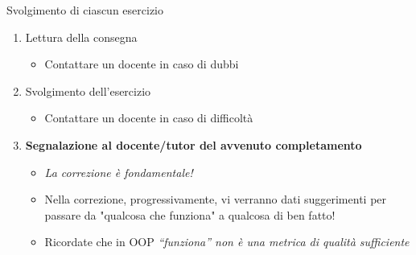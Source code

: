 \documentclass[presentation]{beamer}
\begin{document}
\begin{frame}{Svolgimento di ciascun esercizio}
    \begin{enumerate}\itemsep20pt
        \item Lettura della consegna
        \begin{itemize}
            \item Contattare un docente in caso di dubbi
        \end{itemize}
        \item Svolgimento dell'esercizio
        \begin{itemize}
            \item Contattare un docente in caso di difficoltà
        \end{itemize}
        \item \textbf{Segnalazione al docente/tutor del avvenuto completamento}
        \begin{itemize}
            \item \textit{La correzione è fondamentale!}
            \item Nella correzione, progressivamente, vi verranno dati suggerimenti per passare da "qualcosa che funziona"
            a qualcosa di ben fatto!
            \item Ricordate che in OOP \textit{``funziona'' non è una metrica di qualità sufficiente}
        \end{itemize}
    \end{enumerate}
\end{frame}
\end{document}
